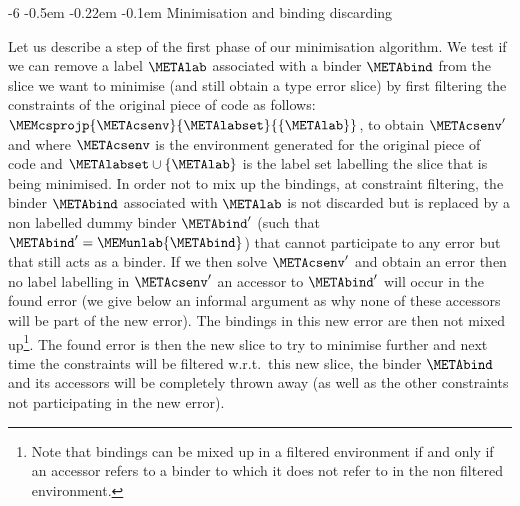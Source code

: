 \documentclass{jfp1}
\makeatletter
\def\subsubsection{\@startsection{subsubsection}{3}{\z@}{-0.2\baselineskip plus -0.1\baselineskip minus -0.1\baselineskip}%
    {-0.5em \@plus -0.22em \@minus -0.1em}{\normalfont\normalsize\bfseries}}%
\newcommand{\sectiontitledot}[1]{#1.}
\renewcommand\subsubsection{\@startsection{subsubsection}{3}{\z@}%
                            {-6\p@ \@plus -1\p@ \@minus -1\p@}%
                            {-0.5em \@plus -0.22em \@minus -0.1em}%
                            {\normalfont\normalsize\bfseries\boldmath\sectiontitledot}}
\makeatother
\begin{document}
\subsubsection{Minimisation and binding discarding}
\label{sec:minbinddiscard}
%


Let us describe a step of the first phase of our minimisation
algorithm.  We test if we can remove a label $\METAlab$ associated
with a binder $\METAbind$ from the slice we want to minimise (and
still obtain a type error slice) by first filtering the constraints of
the original piece of code as follows:
$\MEMcsprojp{\METAcsenv}{\METAlabset}{\{\METAlab\}}$, to obtain
$\METAcsenv'$ and where $\METAcsenv$ is the environment generated for
the original piece of code and $\METAlabset\cup\{\METAlab\}$ is the
label set labelling the slice that is being minimised.  In order not
to mix up the bindings, at constraint filtering, the binder
$\METAbind$ associated with $\METAlab$ is not discarded but is
replaced by a non labelled dummy binder $\METAbind'$ (such that
$\METAbind'=\MEMunlab{\METAbind}$) that cannot participate to any
error but that still acts as a binder.  If we then solve $\METAcsenv'$
and obtain an error then no label labelling in $\METAcsenv'$ an
accessor to $\METAbind'$ will occur in the found error (we give below
an informal argument as why none of these accessors will be part of
the new error).  The bindings in this new error are then not mixed
up\footnote{Note that bindings can be mixed up in a filtered
  environment if and only if an accessor refers to a binder to which
  it does not refer to in the non filtered environment.}.
%
The found error is then the new slice to try to minimise further and
next time the constraints will be filtered w.r.t.\ this new slice, the
binder $\METAbind$ and its accessors will be completely thrown away
(as well as the other constraints not participating in the new error).
\end{document}
